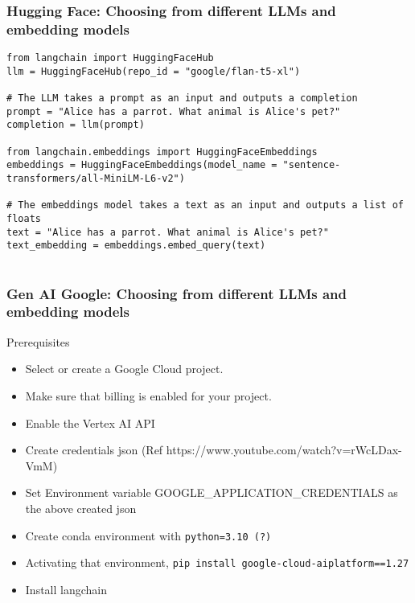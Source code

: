 \begin{frame}[fragile]\frametitle{Hugging Face: Choosing from different LLMs and embedding models}

\begin{lstlisting}
from langchain import HuggingFaceHub
llm = HuggingFaceHub(repo_id = "google/flan-t5-xl")

# The LLM takes a prompt as an input and outputs a completion
prompt = "Alice has a parrot. What animal is Alice's pet?"
completion = llm(prompt)

from langchain.embeddings import HuggingFaceEmbeddings
embeddings = HuggingFaceEmbeddings(model_name = "sentence-transformers/all-MiniLM-L6-v2")

# The embeddings model takes a text as an input and outputs a list of floats
text = "Alice has a parrot. What animal is Alice's pet?"
text_embedding = embeddings.embed_query(text)


\end{lstlisting}


\end{frame}

\begin{frame}[fragile]\frametitle{Gen AI Google: Choosing from different LLMs and embedding models}

Prerequisites
\begin{itemize}
\item Select or create a Google Cloud project.
\item Make sure that billing is enabled for your project.
\item Enable the Vertex AI API
\item Create credentials json (Ref https://www.youtube.com/watch?v=rWcLDax-VmM)
\item Set Environment variable GOOGLE\_APPLICATION\_CREDENTIALS as the above created json
\item Create conda environment with \lstinline|python=3.10 (?)|
\item Activating that environment, \lstinline|pip install google-cloud-aiplatform==1.27|
\item Install langchain
\end{itemize}


\end{frame}


